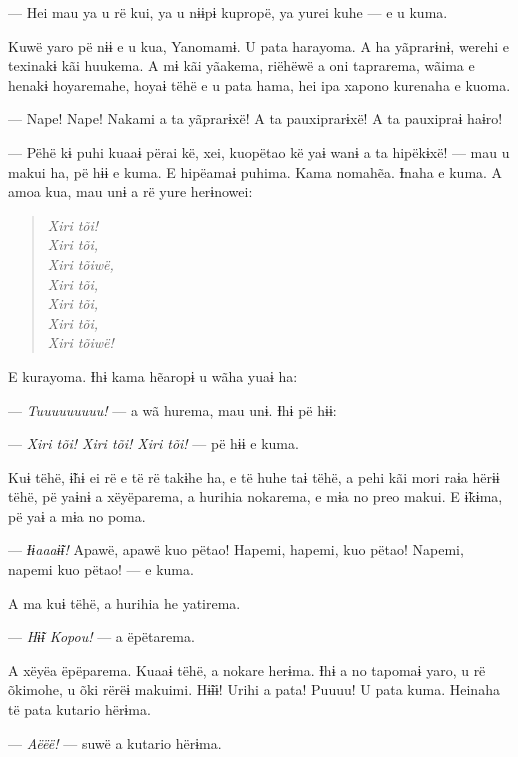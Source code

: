 --- Hei mau ya u rë kui, ya u nɨɨpɨ kupropë, ya yurei kuhe --- e u kuma. 

Kuwë yaro pë nɨɨ e u kua, Yanomamɨ. U pata harayoma. A ha yãprarɨnɨ,
werehi e texinakɨ kãi huukema. A mɨ kãi yãakema, riëhëwë a oni
taprarema, wãima e henakɨ hoyaremahe, hoyaɨ tëhë e u pata hama, hei ipa
xapono kurenaha e kuoma. 

--- Nape! Nape! Nakami a ta yãprarɨxë! A ta pauxiprarɨxë! A ta pauxipraɨ
haɨro! 

--- Pëhë kɨ puhi kuaaɨ përai kë, xei, kuopëtao kë yaɨ wanɨ a ta hipëkɨxë!
--- mau u makui ha, pë hɨɨ e kuma. E hipëamaɨ puhima. Kama nomahẽa.
Ɨnaha e kuma. A amoa kua, mau unɨ a rë yure herɨnowei: 

\begin{verse}
\textit{Xiri tõi!\\
Xiri tõi,\\
Xiri tõiwë,\\
Xiri tõi,\\
Xiri tõi,\\
Xiri tõi,\\
Xiri tõiwë!}
\end{verse}

E kurayoma. Ɨhɨ kama hẽaropɨ u wãha yuaɨ ha: 

--- \textit{Tuuuuuuuuu!} --- a wã hurema, mau unɨ. Ɨhɨ pë hɨɨ: 

--- \textit{Xiri tõi! Xiri tõi! Xiri tõi!} --- pë hɨɨ e kuma. 

Kuɨ tëhë, ɨ̃hɨ ei rë e të rë takɨhe ha, e të huhe taɨ tëhë, a pehi kãi
mori raɨa hërɨɨ tëhë, pë yaɨnɨ a xëyëparema, a hurihia nokarema, e mɨa
no preo makui. E ɨ̃kɨma, pë yaɨ a mɨa no poma. 

--- \textit{Ɨɨaaaɨ̃ɨ!} Apawë, apawë kuo pëtao! Hapemi, hapemi, kuo pëtao! Napemi,
napemi kuo pëtao! --- e kuma. 

A ma kuɨ tëhë, a hurihia he yatirema. 

--- \textit{Hɨ̃ɨ Kopou!} --- a ëpëtarema. 

A xëyëa ëpëparema. Kuaaɨ tëhë, a nokare herɨma. Ɨhɨ a no tapomaɨ yaro, u
rë õkimohe, u õki rërëɨ makuimi. Hɨ̃ɨɨ! Urihi a pata! Puuuu! U pata kuma.
Heinaha të pata kutario hërɨma.

--- \textit{Aëëë!} --- suwë a kutario hërɨma. 



